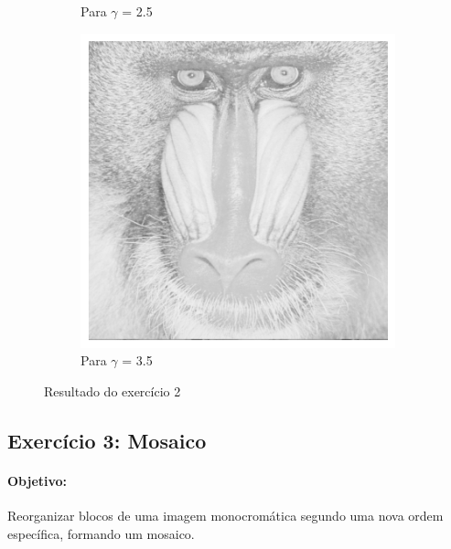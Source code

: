 \documentclass[12pt,a4paper]{report}
\begin{document}
\begin{figure}[H]
\begin{subfigure}[b]{0.3\textwidth}
        \caption{Para \( \gamma \) = 2.5 }
    \end{subfigure}
    \hfill
    \begin{subfigure}[b]{0.3\textwidth}
        \includegraphics[width=\textwidth]{imagens/ex2-3.png}
        \caption{Para \( \gamma \) = 3.5 }
    \end{subfigure}
    \caption{Resultado do exercício 2}
\end{figure}


\subsection{Exercício 3: Mosaico}
\paragraph{Objetivo:} 
Reorganizar blocos de uma imagem monocromática segundo uma nova ordem específica, formando um mosaico.
\end{document}
